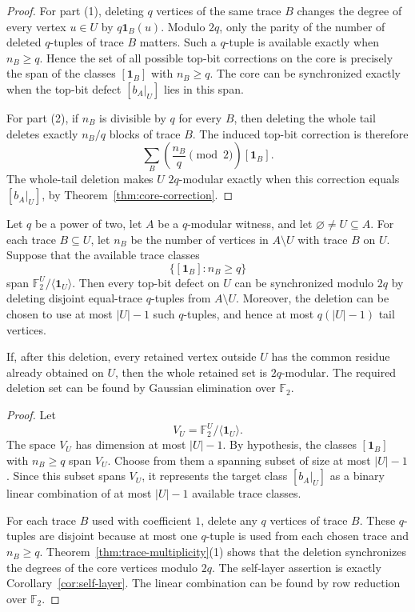 \documentclass[thmsec,dntnbr,nolinenbrs]{dmgt}
\numberwithin{equation}{section}
\newcommand{\F}{\mathbb{F}}
\newcommand{\one}{\mathbf{1}}
\begin{document}
\begin{proof}
For part \textup{(1)}, deleting \(q\) vertices of the same trace \(B\) changes the degree of every vertex \(u\in U\) by \(q\one_B(u)\).  Modulo \(2q\), only the parity of the number of deleted \(q\)-tuples of trace \(B\) matters.  Such a \(q\)-tuple is available exactly when \(n_B\ge q\).  Hence the set of all possible top-bit corrections on the core is precisely the span of the classes \([\one_B]\) with \(n_B\ge q\).  The core can be synchronized exactly when the top-bit defect \([b_A|_U]\) lies in this span.

For part \textup{(2)}, if \(n_B\) is divisible by \(q\) for every \(B\), then deleting the whole tail deletes exactly \(n_B/q\) blocks of trace \(B\).  The induced top-bit correction is therefore
\[
        \sum_B\left(\frac{n_B}{q}\pmod 2\right)[\one_B].
\]
The whole-tail deletion makes \(U\) \(2q\)-modular exactly when this correction equals \([b_A|_U]\), by Theorem~\ref{thm:core-correction}.
\end{proof}

\begin{theorem}\label{thm:rank-rich}
Let \(q\) be a power of two, let \(A\) be a \(q\)-modular witness, and let \(\varnothing\ne U\subseteq A\).  For each trace \(B\subseteq U\), let \(n_B\) be the number of vertices in \(A\setminus U\) with trace \(B\) on \(U\).  Suppose that the available trace classes
\[
        \{[\one_B]:n_B\ge q\}
\]
span \(\F_2^U/\langle \one_U\rangle\).  Then every top-bit defect on \(U\) can be synchronized modulo \(2q\) by deleting disjoint equal-trace \(q\)-tuples from \(A\setminus U\).  Moreover, the deletion can be chosen to use at most \(|U|-1\) such \(q\)-tuples, and hence at most \(q(|U|-1)\) tail vertices.

If, after this deletion, every retained vertex outside \(U\) has the common residue already obtained on \(U\), then the whole retained set is \(2q\)-modular.  The required deletion set can be found by Gaussian elimination over \(\F_2\).
\end{theorem}

\begin{proof}
Let
\[
        V_U=\F_2^U/\langle \one_U\rangle .
\]
The space \(V_U\) has dimension at most \(|U|-1\).  By hypothesis, the classes \([\one_B]\) with \(n_B\ge q\) span \(V_U\).  Choose from them a spanning subset of size at most \(|U|-1\).  Since this subset spans \(V_U\), it represents the target class \([b_A|_U]\) as a binary linear combination of at most \(|U|-1\) available trace classes.

For each trace \(B\) used with coefficient \(1\), delete any \(q\) vertices of trace \(B\).  These \(q\)-tuples are disjoint because at most one \(q\)-tuple is used from each chosen trace and \(n_B\ge q\).  Theorem~\ref{thm:trace-multiplicity}\textup{(1)} shows that the deletion synchronizes the degrees of the core vertices modulo \(2q\).  The self-layer assertion is exactly Corollary~\ref{cor:self-layer}.  The linear combination can be found by row reduction over \(\F_2\).
\end{proof}
\end{document}
